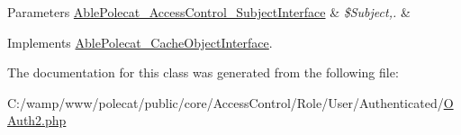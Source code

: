 \begin{DoxyParams}[1]{Parameters}
\hyperlink{interface_able_polecat___access_control___subject_interface}{Able\+Polecat\+\_\+\+Access\+Control\+\_\+\+Subject\+Interface} & {\em \$\+Subject,.} & \\
\hline
\end{DoxyParams}


Implements \hyperlink{interface_able_polecat___cache_object_interface_a365e24d7b066205cafa2a5cce3a4f224}{Able\+Polecat\+\_\+\+Cache\+Object\+Interface}.



The documentation for this class was generated from the following file\+:\begin{DoxyCompactItemize}
\item 
C\+:/wamp/www/polecat/public/core/\+Access\+Control/\+Role/\+User/\+Authenticated/\hyperlink{_o_auth2_8php}{O\+Auth2.\+php}\end{DoxyCompactItemize}
